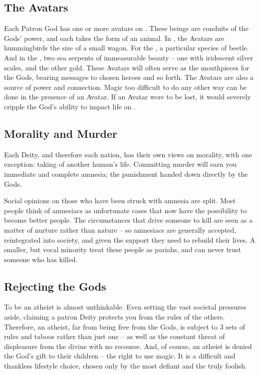 \documentclass[blue]{GL2020}
\begin{document}
\subsection*{The Avatars}
Each Patron God has one or more avatars on \pEarth{}. These beings are conduits of the Gods’ power, and each takes the form of an animal. In \pFarm{}, the Avatars are hummingbirds the size of a small wagon. For the \pTech{}, a particular species of beetle. And in the \pShip{}, two sea serpents of immeasurable beauty -- one with iridescent silver scales, and the other gold. These Avatars will often serve as the mouthpieces for the Gods, bearing messages to chosen heroes and so forth. The Avatars are also a source of power and connection. Magic too difficult to do any other way can be done in the presence of an Avatar. If an Avatar were to be lost, it would severely cripple the God’s ability to impact life on \pEarth{}.

\subsection*{Morality and Murder}
Each Deity, and therefore each nation, has their own views on morality, with one exception: taking of another human's life. Committing murder will earn you immediate and complete amnesia; the punishment handed down directly by the Gods. 

Social opinions on those who have been struck with amnesia are split. Most people think of amnesiacs as unfortunate cases that now have the possibility to become better people. The circumstances that drive someone to kill are seen as a matter of nurture rather than nature -- so amnesiacs are generally accepted, reintegrated into society, and given the support they need to rebuild their lives. A smaller, but vocal minority treat these people as pariahs, and can never trust someone who has killed.

\subsection*{Rejecting the Gods}
To be an atheist is almost unthinkable. Even setting the vast societal pressures aside, claiming a patron Deity protects you from the rules of the others. Therefore, an atheist, far from being free from the Gods, is subject to 3 sets of rules and taboos rather than just one -- as well as the constant threat of displeasure from the divine with no recourse. And, of course, an atheist is denied the God’s gift to their children -- the right to use magic. It is a difficult and thankless lifestyle choice, chosen only by the most defiant and the truly foolish.
\end{document}
